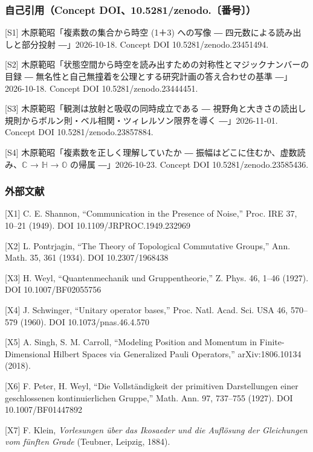 \documentclass[
  a4paper,
]{ltjsarticle}
\begin{document}
\subsubsection{自己引用（Concept
DOI、10.5281/zenodo.〔番号〕）}\label{ux81eaux5df1ux5f15ux7528concept-doi10.5281zenodo.ux756aux53f7}

{[}S1{]} 木原範昭「複素数の集合から時空 (1＋3) への写像 ―
四元数による読み出しと部分投射 ―」2026-10-18. Concept DOI
10.5281/zenodo.23451494.

{[}S2{]}
木原範昭「状態空間から時空を読み出すための対称性とマジックナンバーの目録
― 無名性と自己無撞着を公理とする研究計画の答え合わせの基準
―」2026-10-18. Concept DOI 10.5281/zenodo.23444451.

{[}S3{]} 木原範昭「観測は放射と吸収の同時成立である ―
視野角と大きさの読出し規則からボルン則・ベル相関・ツィレルソン限界を導く
―」2026-11-01. Concept DOI 10.5281/zenodo.23857884.

{[}S4{]} 木原範昭「複素数を正しく理解していたか ―
振幅はどこに住むか、虚数読み、\(\mathbb{C}\) → \(\mathbb{H}\) →
\(\mathbb{O}\) の帰属 ―」2026-10-23. Concept DOI
10.5281/zenodo.23585436.

\subsubsection{外部文献}\label{ux5916ux90e8ux6587ux732e}

{[}X1{]} C. E. Shannon, ``Communication in the Presence of Noise,''
Proc. IRE 37, 10--21 (1949). DOI 10.1109/JRPROC.1949.232969

{[}X2{]} L. Pontrjagin, ``The Theory of Topological Commutative
Groups,'' Ann. Math. 35, 361 (1934). DOI 10.2307/1968438

{[}X3{]} H. Weyl, ``Quantenmechanik und Gruppentheorie,'' Z. Phys. 46,
1--46 (1927). DOI 10.1007/BF02055756

{[}X4{]} J. Schwinger, ``Unitary operator bases,'' Proc. Natl. Acad.
Sci. USA 46, 570--579 (1960). DOI 10.1073/pnas.46.4.570

{[}X5{]} A. Singh, S. M. Carroll, ``Modeling Position and Momentum in
Finite-Dimensional Hilbert Spaces via Generalized Pauli Operators,''
arXiv:1806.10134 (2018).

{[}X6{]} F. Peter, H. Weyl, ``Die Vollständigkeit der primitiven
Darstellungen einer geschlossenen kontinuierlichen Gruppe,'' Math. Ann.
97, 737--755 (1927). DOI 10.1007/BF01447892

{[}X7{]} F. Klein, \emph{Vorlesungen über das Ikosaeder und die
Auflösung der Gleichungen vom fünften Grade} (Teubner, Leipzig, 1884).
\end{document}
